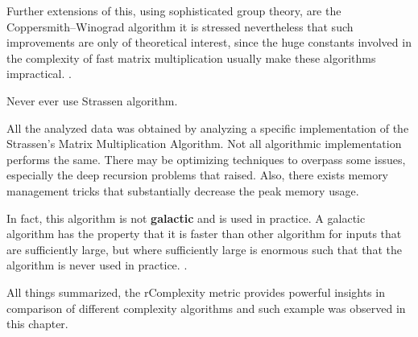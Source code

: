 Further extensions of this, using sophisticated group theory, are the Coppersmith–Winograd algorithm it is stressed nevertheless that such improvements are only of theoretical interest, since the huge constants involved in the complexity of fast matrix multiplication usually make these algorithms impractical. \cite{le2012faster}.

\begin{pitfall}
Never ever use Strassen algorithm.
\end{pitfall}
All the analyzed data was obtained by analyzing a specific implementation of the Strassen's Matrix Multiplication Algorithm. Not all algorithmic implementation performs the same. There may be optimizing techniques to overpass some issues, especially the deep recursion problems that raised. Also, there exists memory management tricks that substantially decrease the peak memory usage. 

In fact, this algorithm is not \textbf{galactic} and is used in practice. A galactic algorithm has the property that it is faster than other algorithm for inputs that are sufficiently large, but where sufficiently large is enormous such that that the algorithm is never used in practice. \cite{le2012faster}.

All things summarized, the rComplexity metric provides powerful insights in comparison of different complexity algorithms and such example was observed in this chapter.